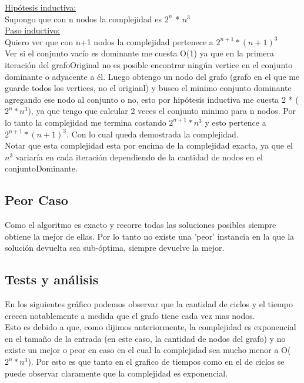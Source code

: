 \underline{Hipótesis inductiva:}\\

Supongo que con n nodos la complejidad es $2^n$ * $n^3$\\

\underline{Paso inductivo:}\\

Quiero ver que con n+1 nodos la complejidad pertenece a $2^{n+1}*(n+1)^3$\\

Ver si el conjunto vacío es dominante me cuesta O(1) ya que en la primera iteración del grafoOriginal no es posible encontrar ningún vertice en el conjunto dominante o adyacente a él. Luego obtengo un nodo del grafo (grafo en el que me guarde todos los vertices, no el origianl) y busco el minimo conjunto dominante agregando ese nodo al conjunto o no, esto por hipótesis inductiva me cuesta 2 * ($2^n * n^3$), ya que tengo que calcular 2 veces el conjunto minimo para n nodos. Por lo tanto la complejidad me termina costando  $2^{n+1}*n^3$ y esto pertence a $2^{n+1}*(n+1)^3$. Con lo cual queda demostrada la complejidad.\\

Notar que esta complejidad esta por encima de la complejidad exacta, ya que el $n^3$ variaría en cada iteración dependiendo de la cantidad de nodos en el conjuntoDominante.

\subsection{Peor Caso}

Como el algoritmo es exacto y recorre todas las soluciones posibles siempre obtiene la mejor de ellas. Por lo tanto no existe una 'peor' instancia
en la que la solución devuelta sea sub-óptima, siempre devuelve la mejor.

\subsection{Tests y análisis}
En los siguientes gráfico podemos observar que la cantidad de ciclos y el tiempo crecen notablemente a medida que el grafo tiene cada vez mas nodos.\\
Esto es debido a que, como dijimos anteriormente, la complejidad es exponencial en el tamaño de la entrada (en este caso, la cantidad de nodos 
del grafo) y no existe un mejor o peor en caso en el cual la complejidad sea mucho menor a O($2^n*n^3$). Por esto es que tanto en el grafico de tiempos
 como en el de ciclos se puede observar claramente que la complejidad es exponencial.

